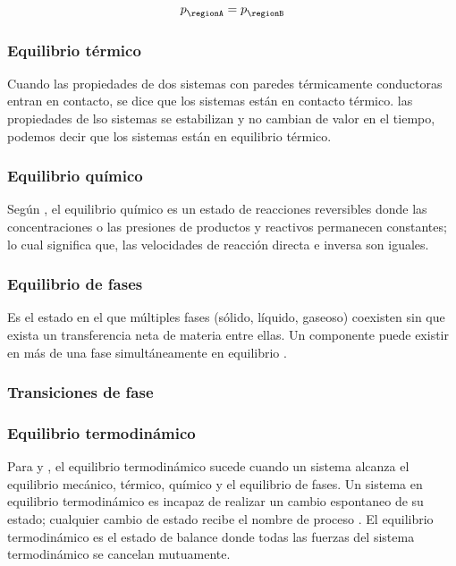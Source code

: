   \begin{equation*}
    \pressure[]{\regionA} = \pressure[]{\regionB}
  \end{equation*}
  
  \subsubsection{Equilibrio térmico} 
    Cuando las propiedades de dos sistemas con paredes térmicamente conductoras entran en contacto, se dice que los sistemas están en contacto térmico. las propiedades de lso sistemas se estabilizan y no cambian de valor en el tiempo, podemos decir que los sistemas están en equilibrio térmico.
    
  \subsubsection{Equilibrio químico} 
    Según \textcite{bib:Perry2000}, el equilibrio químico es un estado de reacciones reversibles donde las concentraciones o las presiones de productos y reactivos permanecen constantes; lo cual significa que, las velocidades de reacción directa e inversa son iguales.

  \subsubsection{Equilibrio de fases} 
    Es el estado en el que múltiples fases (sólido, líquido, gaseoso) coexisten sin que exista un transferencia neta de materia entre ellas. Un componente puede existir en más de una fase simultáneamente en equilibrio \textcite{bib:ball2004fisicoquímica}.

  \subsubsection{Transiciones de fase}


  \subsubsection{Equilibrio termodinámico} 
    Para \parencite{bib:Reisel2021} y \parencite{bib:cengel2015termodinamica}, el equilibrio termodinámico sucede cuando un sistema alcanza el equilibrio mecánico, térmico, químico y el equilibrio de fases.
    Un sistema en equilibrio termodinámico es incapaz de realizar un cambio espontaneo de su estado; cualquier cambio de estado recibe el nombre de proceso \parencite[p. 39]{bib:cengel2015termodinamica}. El equilibrio termodinámico es el estado de balance donde todas las fuerzas del sistema termodinámico se cancelan mutuamente.


